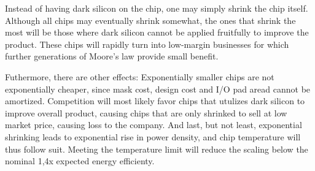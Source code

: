Instead of having dark silicon on the chip, one may simply shrink the chip itself.
Although all chips may eventually shrink somewhat, the ones that shrink the most will be those where dark silicon cannot be applied fruitfully to improve the product.
These chips will rapidly turn into low-margin businesses for which further generations of Moore’s law provide small benefit.

Futhermore, there are other effects: Exponentially smaller chips are not exponentially cheaper, since mask cost, design cost and I/O pad aread cannot be amortized. 
Competition will most likely favor chips that utulizes dark silicon to improve overall product, causing chips that are only shrinked to sell at low market price, causing loss to the company.
And last, but not least, exponential shrinking leads to exponential rise in power density, and chip temperature will thus follow suit.
Meeting the temperature limit will reduce the scaling below the nominal 1,4x expected energy efficienty. \cite{dark-silicon}



